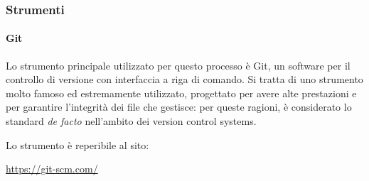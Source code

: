 \subsubsection{Strumenti}
\paragraph{Git}
Lo strumento principale utilizzato per questo processo è Git, un software per il controllo di versione con interfaccia a riga di comando. Si tratta di uno strumento molto famoso ed estremamente utilizzato, progettato per avere alte prestazioni e per garantire l'integrità dei file che gestisce: per queste ragioni, è considerato lo standard \textit{de facto} nell'ambito dei version control systems.
\par Lo strumento è reperibile al sito:
\begin{center}
    \url{https://git-scm.com/}
\end{center}
